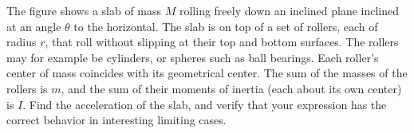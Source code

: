 The figure shows a slab of mass $M$ rolling freely down an inclined plane inclined
at an angle $\theta$ to the horizontal. The slab is on top of a set of rollers, each of radius $r$,
that roll without slipping at their top and bottom surfaces. The rollers may for example be
cylinders, or spheres such as ball bearings. Each roller's center of mass coincides with its
geometrical center. The sum of the masses of the rollers is $m$,
and the sum of their moments of inertia (each about its own center) is $I$.
Find the acceleration of the slab, and verify that your expression has the correct
behavior in interesting limiting cases.\answercheck
